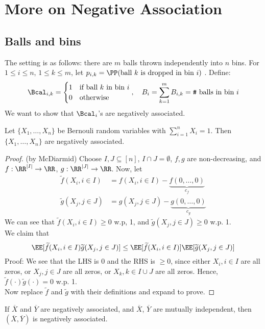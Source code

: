 \chapter{More on Negative Association}
\section{Balls and bins}
The setting is as follows: there are $m$ balls thrown independently into $n$ bins. For $1\leq i \leq n$, $1 \leq k \leq m$, let $p_{i,k} = \PP(\text{ball $k$ is dropped in bin $i$})$ . Define:
\[
\Bcal_{i,k} = \begin{cases}
    1&\text{if ball $k$ in bin $i$} \\ 0&\text{otherwise}
\end{cases},\quad B_i = \sum_{k=1}^m B_{i,k} = \text{\texttt{\#} balls in bin $i$}
\]
We want to show that $\Bcal_i$'s are negatively associated.
\begin{lemma}\label{lemma:zero-one}
Let $\{X_1, \dots, X_n\}$ be Bernouli random variables with $\sum_{i=1}^n X_i = 1$. Then $\{X_1, \dots, X_n\}$ are negatively associated.
\end{lemma}
\begin{proof}(by McDiarmid) Choose $I, J \subseteq [n]$, $I \cap J = \emptyset$, $f, g$ are non-decreasing, and $f: \RR^{|I|} \to \RR$, $g: \RR^{|J|} \to \RR$. Now, let
\begin{align*}
\widetilde{f}(X_i, i \in I) &= f(X_i, i \in I) - \underbrace{f(0, \dots, 0)}_{c_f} \\
\widetilde{g}(X_j,j \in J) &= g(X_j, j \in J) - \underbrace{g(0, \dots, 0)}_{c_g}
\end{align*}
We can see that $\widetilde{f}(X_i, i \in I) \geq 0$ w.p, 1, and $\widetilde{g}(X_j, j \in J) \geq 0$ w.p. 1. \\
We claim that
\[
\EE[\widetilde{f}(X_i, i \in I) \widetilde{g}(X_j, j \in J)] \leq \EE[\widetilde{f}(X_i, i \in I)]\EE[\widetilde{g}(X_j, j \in J)]
\]
Proof: We see that the LHS is 0 and the RHS is $\geq 0$, since either $X_i, i \in I$ are all zeros, or $X_j, j \in J$ are all zeros, or $X_k, k \in I \cup J$ are all zeros. Hence, $\widetilde{f}(\cdot) \widetilde{g}(\cdot) = 0$ w.p. 1. \\
Now replace $\widetilde{f}$ and $\widetilde{g}$ with their definitions and expand to prove.
\end{proof}
\begin{prop}\label{prop:union-neg-asso}
If $\overline{X}$ and $\overline{Y}$ are negatively associated, and $\overline{X}$, $\overline{Y}$ are mutually independent, then $(\overline{X}, \overline{Y})$ is negatively associated.    
\end{prop}
